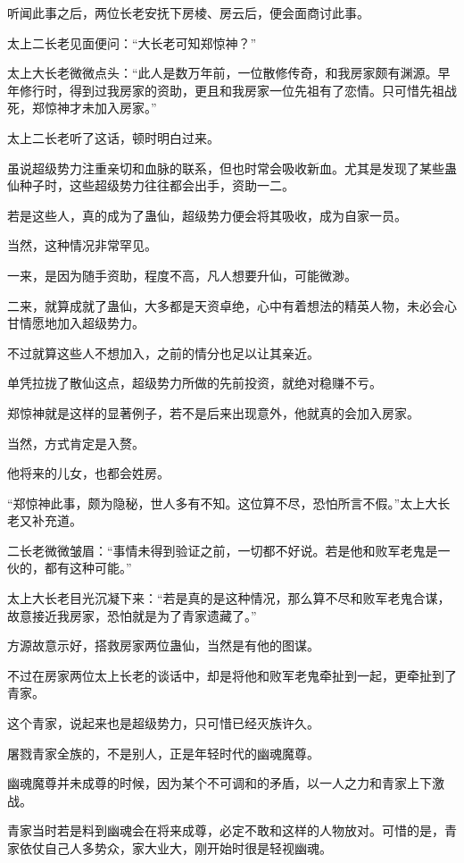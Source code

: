 \begin{this_body}
听闻此事之后，两位长老安抚下房棱、房云后，便会面商讨此事。

太上二长老见面便问：“大长老可知郑惊神？”

太上大长老微微点头：“此人是数万年前，一位散修传奇，和我房家颇有渊源。早年修行时，得到过我房家的资助，更且和我房家一位先祖有了恋情。只可惜先祖战死，郑惊神才未加入房家。”

太上二长老听了这话，顿时明白过来。

虽说超级势力注重亲切和血脉的联系，但也时常会吸收新血。尤其是发现了某些蛊仙种子时，这些超级势力往往都会出手，资助一二。

若是这些人，真的成为了蛊仙，超级势力便会将其吸收，成为自家一员。

当然，这种情况非常罕见。

一来，是因为随手资助，程度不高，凡人想要升仙，可能微渺。

二来，就算成就了蛊仙，大多都是天资卓绝，心中有着想法的精英人物，未必会心甘情愿地加入超级势力。

不过就算这些人不想加入，之前的情分也足以让其亲近。

单凭拉拢了散仙这点，超级势力所做的先前投资，就绝对稳赚不亏。

郑惊神就是这样的显著例子，若不是后来出现意外，他就真的会加入房家。

当然，方式肯定是入赘。

他将来的儿女，也都会姓房。

“郑惊神此事，颇为隐秘，世人多有不知。这位算不尽，恐怕所言不假。”太上大长老又补充道。

二长老微微皱眉：“事情未得到验证之前，一切都不好说。若是他和败军老鬼是一伙的，都有这种可能。”

太上大长老目光沉凝下来：“若是真的是这种情况，那么算不尽和败军老鬼合谋，故意接近我房家，恐怕就是为了青家遗藏了。”

方源故意示好，搭救房家两位蛊仙，当然是有他的图谋。

不过在房家两位太上长老的谈话中，却是将他和败军老鬼牵扯到一起，更牵扯到了青家。

这个青家，说起来也是超级势力，只可惜已经灭族许久。

屠戮青家全族的，不是别人，正是年轻时代的幽魂魔尊。

幽魂魔尊并未成尊的时候，因为某个不可调和的矛盾，以一人之力和青家上下激战。

青家当时若是料到幽魂会在将来成尊，必定不敢和这样的人物放对。可惜的是，青家依仗自己人多势众，家大业大，刚开始时很是轻视幽魂。


\end{this_body}
